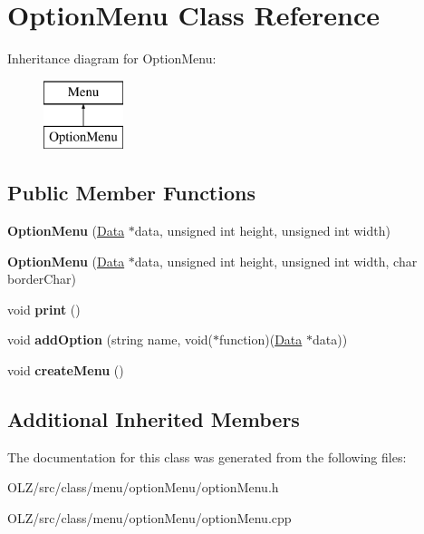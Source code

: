 \hypertarget{class_option_menu}{}\section{Option\+Menu Class Reference}
\label{class_option_menu}
Inheritance diagram for Option\+Menu\+:\begin{figure}[H]
\begin{center}
\leavevmode
\includegraphics[height=2.000000cm]{class_option_menu}
\end{center}
\end{figure}
\subsection*{Public Member Functions}
\begin{DoxyCompactItemize}
\item 
\hypertarget{class_option_menu_ad18773c1f7fc0f110b912de1cc6bb2eb}{}{\bfseries Option\+Menu} (\hyperlink{class_data}{Data} $\ast$data, unsigned int height, unsigned int width)\label{class_option_menu_ad18773c1f7fc0f110b912de1cc6bb2eb}

\item 
\hypertarget{class_option_menu_a2a847d1be856ceb20dfedc5c9f3bb441}{}{\bfseries Option\+Menu} (\hyperlink{class_data}{Data} $\ast$data, unsigned int height, unsigned int width, char border\+Char)\label{class_option_menu_a2a847d1be856ceb20dfedc5c9f3bb441}

\item 
\hypertarget{class_option_menu_a753b91d8c99330c962d6ecbe520800d2}{}void {\bfseries print} ()\label{class_option_menu_a753b91d8c99330c962d6ecbe520800d2}

\item 
\hypertarget{class_option_menu_a82ce2285fb79bec7073b5358648f19b6}{}void {\bfseries add\+Option} (string name, void($\ast$function)(\hyperlink{class_data}{Data} $\ast$data))\label{class_option_menu_a82ce2285fb79bec7073b5358648f19b6}

\item 
\hypertarget{class_option_menu_a30620df0e9871ce3bbdccf3cb094785f}{}void {\bfseries create\+Menu} ()\label{class_option_menu_a30620df0e9871ce3bbdccf3cb094785f}

\end{DoxyCompactItemize}
\subsection*{Additional Inherited Members}


The documentation for this class was generated from the following files\+:\begin{DoxyCompactItemize}
\item 
O\+L\+Z/src/class/menu/option\+Menu/option\+Menu.\+h\item 
O\+L\+Z/src/class/menu/option\+Menu/option\+Menu.\+cpp\end{DoxyCompactItemize}
